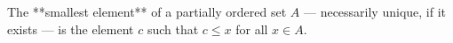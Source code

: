 The **smallest element** of a partially ordered set $A$ — necessarily unique, if it exists — is the element $c$ such that $c \leq x$ for all $x \in A$.
